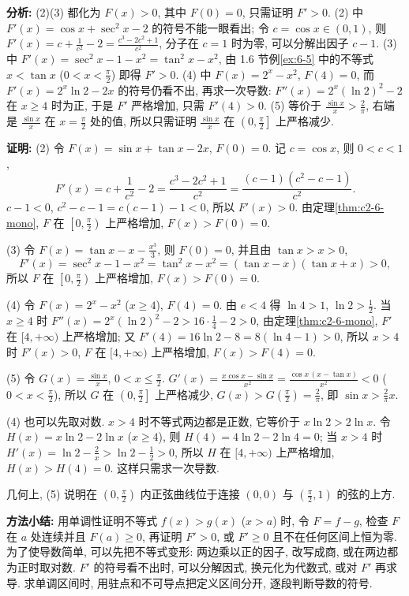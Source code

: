 \documentclass[UTF8,openany]{ctexbook}
\theoremstyle{chinesetextbook}
\newenvironment{cnproof}{\par\indent\textbf{证明:} \ignorespaces}{\par}
\begin{document}
\par\indent\textbf{分析:} (2)(3) 都化为 $F(x)>0$, 其中 $F(0)=0$, 只需证明 $F'>0$. (2) 中 $F'(x)=\cos x+\sec^2x-2$ 的符号不能一眼看出; 令 $c=\cos x\in(0,1)$, 则 $\displaystyle F'(x)=c+\frac1{c^2}-2=\frac{c^3-2c^2+1}{c^2}$, 分子在 $c=1$ 时为零, 可以分解出因子 $c-1$. (3) 中 $F'(x)=\sec^2x-1-x^2=\tan^2x-x^2$, 由 1.6 节例\ref{ex:6-5} 中的不等式 $x<\tan x$ ($\displaystyle0<x<\frac\pi2$) 即得 $F'>0$. (4) 中 $F(x)=2^x-x^2$, $F(4)=0$, 而 $F'(x)=2^x\ln2-2x$ 的符号仍看不出, 再求一次导数: $F''(x)=2^x(\ln2)^2-2$ 在 $x\ge4$ 时为正, 于是 $F'$ 严格增加, 只需 $F'(4)>0$. (5) 等价于 $\displaystyle\frac{\sin x}x>\frac2\pi$, 右端是 $\displaystyle\frac{\sin x}x$ 在 $\displaystyle x=\frac\pi2$ 处的值, 所以只需证明 $\displaystyle\frac{\sin x}x$ 在 $\displaystyle\left(0,\frac\pi2\right]$ 上严格减少.
\begin{cnproof}
(2) 令 $F(x)=\sin x+\tan x-2x$, $F(0)=0$. 记 $c=\cos x$, 则 $0<c<1$,
\[
F'(x)=c+\frac1{c^2}-2=\frac{c^3-2c^2+1}{c^2}=\frac{(c-1)(c^2-c-1)}{c^2}.
\]
$c-1<0$, $c^2-c-1=c(c-1)-1<0$, 所以 $F'(x)>0$. 由定理\ref{thm:c2-6-mono}, $F$ 在 $\displaystyle\left[0,\frac\pi2\right)$ 上严格增加, $F(x)>F(0)=0$.

(3) 令 $\displaystyle F(x)=\tan x-x-\frac{x^3}3$, 则 $F(0)=0$, 并且由 $\tan x>x>0$,
\[
F'(x)=\sec^2x-1-x^2=\tan^2x-x^2=(\tan x-x)(\tan x+x)>0,
\]
所以 $F$ 在 $\displaystyle\left[0,\frac\pi2\right)$ 上严格增加, $F(x)>F(0)=0$.

(4) 令 $F(x)=2^x-x^2$ ($x\ge4$), $F(4)=0$. 由 $e<4$ 得 $\ln4>1$, $\displaystyle\ln2>\frac12$. 当 $x\ge4$ 时 $\displaystyle F''(x)=2^x(\ln2)^2-2>16\cdot\frac14-2>0$, 由定理\ref{thm:c2-6-mono}, $F'$ 在 $[4,+\infty)$ 上严格增加; 又 $F'(4)=16\ln2-8=8(\ln4-1)>0$, 所以 $x>4$ 时 $F'(x)>0$, $F$ 在 $[4,+\infty)$ 上严格增加, $F(x)>F(4)=0$.

(5) 令 $\displaystyle G(x)=\frac{\sin x}x$, $\displaystyle0<x\le\frac\pi2$. $\displaystyle G'(x)=\frac{x\cos x-\sin x}{x^2}=\frac{\cos x\,(x-\tan x)}{x^2}<0$ ($\displaystyle0<x<\frac\pi2$), 所以 $G$ 在 $\displaystyle\left(0,\frac\pi2\right]$ 上严格减少, $\displaystyle G(x)>G\left(\frac\pi2\right)=\frac2\pi$, 即 $\displaystyle\sin x>\frac2\pi x$.
\end{cnproof}
(4) 也可以先取对数. $x>4$ 时不等式两边都是正数, 它等价于 $x\ln2>2\ln x$. 令 $H(x)=x\ln2-2\ln x$ ($x\ge4$), 则 $H(4)=4\ln2-2\ln4=0$; 当 $x>4$ 时 $\displaystyle H'(x)=\ln2-\frac2x>\ln2-\frac12>0$, 所以 $H$ 在 $[4,+\infty)$ 上严格增加, $H(x)>H(4)=0$. 这样只需求一次导数.

几何上, (5) 说明在 $\displaystyle\left(0,\frac\pi2\right)$ 内正弦曲线位于连接 $(0,0)$ 与 $\displaystyle\left(\frac\pi2,1\right)$ 的弦的上方.
\par\indent\textbf{方法小结:} 用单调性证明不等式 $f(x)>g(x)$ ($x>a$) 时, 令 $F=f-g$, 检查 $F$ 在 $a$ 处连续并且 $F(a)\ge0$, 再证明 $F'>0$, 或 $F'\ge0$ 且不在任何区间上恒为零. 为了使导数简单, 可以先把不等式变形: 两边乘以正的因子, 改写成商, 或在两边都为正时取对数. $F'$ 的符号看不出时, 可以分解因式, 换元化为代数式, 或对 $F'$ 再求导. 求单调区间时, 用驻点和不可导点把定义区间分开, 逐段判断导数的符号.
\end{document}

